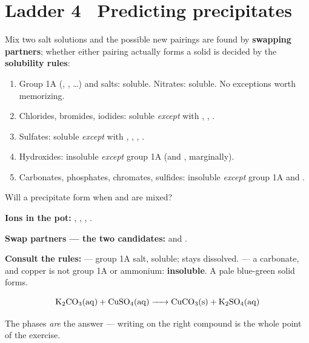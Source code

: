 \documentclass{apchem-worksheet}
\begin{document}
\section*{\sffamily Ladder 4 \textbullet\ Predicting precipitates}

Mix two salt solutions and the possible new pairings are found by
\textbf{swapping partners}; whether either pairing actually forms a solid
is decided by the \textbf{solubility rules}:

\begin{enumerate}[leftmargin=*,itemsep=0.15em]
  \item Group 1A (, , \ldots) and  salts:
        soluble. Nitrates: soluble. No exceptions worth memorizing.
  \item Chlorides, bromides, iodides: soluble \emph{except} with
        , , .
  \item Sulfates: soluble \emph{except} with , ,
        , .
  \item Hydroxides: insoluble \emph{except} group 1A (and ,
        marginally).
  \item Carbonates, phosphates, chromates, sulfides: insoluble
        \emph{except} group 1A and .
\end{enumerate}

\begin{workedexample}
Will a precipitate form when  and  are mixed?

\textbf{Ions in the pot:} , , ,
.

\textbf{Swap partners --- the two candidates:}  and
.

\textbf{Consult the rules:}  --- group 1A salt, soluble; stays
dissolved.  --- a carbonate, and copper is not group 1A or
ammonium: \textbf{insoluble}. A pale blue-green solid forms.

\[ \ce{K2CO3(aq) + CuSO4(aq) -> CuCO3(s) + K2SO4(aq)} \]

The phases \emph{are} the answer --- writing  on the right
compound is the whole point of the exercise.
\end{workedexample}
\end{document}
